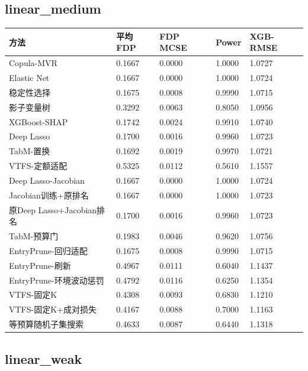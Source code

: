 \documentclass[UTF8,11pt,a4paper]{ctexart}
\begin{document}
\subsection{linear\_medium}\label{linear_medium}

{\def\LTcaptype{none} %
{
\footnotesize
\begin{longtable}[]{@{}lllll@{}}
\toprule\noalign{}
方法 & 平均FDP & FDP MCSE & Power & XGB-RMSE \\
\midrule\noalign{}
\endhead
\bottomrule\noalign{}
\endlastfoot
Copula-MVR & 0.1667 & 0.0000 & 1.0000 & 1.0727 \\
Elastic Net & 0.1667 & 0.0000 & 1.0000 & 1.0724 \\
稳定性选择 & 0.1675 & 0.0008 & 0.9990 & 1.0715 \\
影子变量树 & 0.3292 & 0.0063 & 0.8050 & 1.0956 \\
XGBoost-SHAP & 0.1742 & 0.0024 & 0.9910 & 1.0740 \\
Deep Lasso & 0.1700 & 0.0016 & 0.9960 & 1.0723 \\
TabM-置换 & 0.1692 & 0.0019 & 0.9970 & 1.0721 \\
VTFS-定额适配 & 0.5325 & 0.0112 & 0.5610 & 1.1557 \\
Deep Lasso-Jacobian & 0.1667 & 0.0000 & 1.0000 & 1.0724 \\
Jacobian训练+原排名 & 0.1667 & 0.0000 & 1.0000 & 1.0723 \\
原Deep Lasso+Jacobian排名 & 0.1700 & 0.0016 & 0.9960 & 1.0723 \\
TabM-预算门 & 0.1983 & 0.0046 & 0.9620 & 1.0756 \\
EntryPrune-回归适配 & 0.1675 & 0.0008 & 0.9990 & 1.0715 \\
EntryPrune-刷新 & 0.4967 & 0.0111 & 0.6040 & 1.1437 \\
EntryPrune-环境波动惩罚 & 0.4792 & 0.0116 & 0.6250 & 1.1354 \\
VTFS-固定K & 0.4308 & 0.0093 & 0.6830 & 1.1210 \\
VTFS-固定K+成对损失 & 0.4167 & 0.0088 & 0.7000 & 1.1163 \\
等预算随机子集搜索 & 0.4633 & 0.0087 & 0.6440 & 1.1318 \\
\end{longtable}
}
}

\subsection{linear\_weak}\label{linear_weak}
\end{document}
